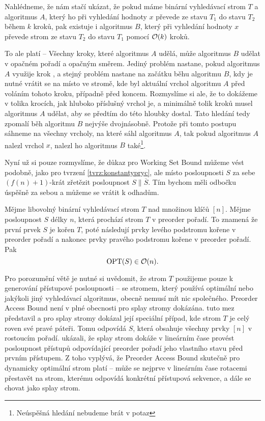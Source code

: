\begin{dukaz}
Nahlédneme, že nám stačí ukázat, že pokud máme binární vyhledávací strom $T$ a
algoritmus $A$, který ho při vyhledání hodnoty $x$ převede ze stavu $T_1$ do stavu
$T_2$ během $k$ kroků, pak existuje i algoritmus $B$, který při vyhledání hodnoty
$x$ převede strom ze stavu $T_2$ do stavu $T_1$ pomocí $\mathcal O(k)$ kroků.

To ale platí -- Všechny kroky, které algoritmus $A$ udělá, může algoritmus $B$
udělat v opačném pořadí a opačným směrem. Jediný problém nastane, pokud
algoritmus $A$ využije krok , a stejný problém nastane na
začátku běhu algoritmu $B$, kdy je nutné vrátit se na místo ve stromě, kde byl
aktuální vrchol algoritmu $A$ před voláním tohoto kroku, případně před koncem.
Rozmyslíme si ale, že to dokážeme v tolika krocích, jak hluboko příslušný
vrchol je, a minimálně tolik kroků musel algoritmus $A$ udělat, aby se předtím
do této hloubky dostal. Tato hledání tedy zpomalí běh algoritmu $B$ nejvýše
dvojnásobně. Protože při tomto postupu sáhneme na všechny vrcholy, na které
sáhl algoritmus $A$, tak pokud algoritmus $A$ nalezl vrchol $x$, nalezl ho
algoritmus $B$ také\footnote{Neúspěšná hledání nebudeme brát v potaz}.
\end{dukaz}

Nyní už si pouze rozmyslíme, že důkaz pro Working Set Bound můžeme vést
podobně, jako pro tvrzení \ref{tvrz:konstantypryc}, ale místo posloupnosti $S$ za sebe
$(f(n)+1)$-krát zřetězit posloupnost $S\|\overline S$. Tím bychom měli odbočku
úspěšně za sebou a můžeme se vrátit k odhadům. 

\begin{veta}
Mějme libovolný binární vyhledávací strom $T$ nad množinou klíčů $[n]$. Mějme posloupnost $S$ délky $n$, která prochází strom $T$ v preorder pořadí. To znamená že první prvek $S$ je kořen $T$, poté následují prvky levého podstromu kořene v preorder pořadí a nakonec prvky pravého podstromu kořene v preorder pořadí. Pak $$\operatorname{OPT}(S)\in \mathcal O(n).$$
\end{veta}

Pro porozumění větě je nutné si uvědomit, že strom $T$ použijeme pouze k
generování přístupové posloupnosti -- se stromem, který používá optimální nebo
jakýkoli jiný vyhledávací algoritmus, obecně nemusí mít nic společného. Preorder
Access Bound není v plné obecnosti pro splay stromy dokázána.
\citet{preordertarjan} tuto mez představil a pro splay stromy dokázal její
speciální případ, kde strom $T$ je celý roven své pravé páteři. Tomu odpovídá
$S$, která obsahuje všechny prvky $[n]$ v rostoucím pořadí.
\citet{preordersplay} ukázali, že splay strom dokáže v lineárním čase provést
posloupnost přístupů odpovídající preorder pořadí jeho vlastního stavu před prvním
přístupem. Z toho vyplývá, že Preorder Access Bound skutečně pro dynamicky
optimální strom platí -- může se nejprve v lineárním čase rotacemi přestavět na strom,
kterému odpovídá konkrétní přístupová sekvence, a dále se chovat jako splay
strom. 

